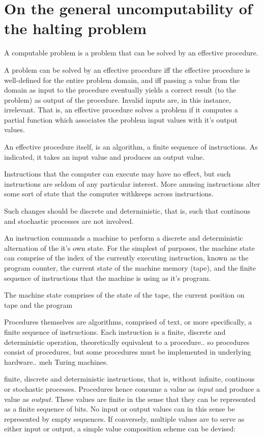 \chapter{On the general uncomputability of the halting problem}

A computable problem is a problem that can be solved by an effective procedure.

A problem can be solved by an effective procedure iff the effective procedure
is well-defined for the entire problem domain, and iff passing a value from the
domain as input to the procedure eventually yields a correct result (to the
problem) as output of the procedure. Invalid inputs are, in this instance,
irrelevant. That is, an effective procedure solves a problem if it computes a
partial function which associates the problem input values with it's output
values.

An effective procedure itself, is an algorithm, a finite sequence of
instructions. As indicated, it takes an input value and produces an output
value.





Instructions that the computer can execute may have no effect, but such
instructions are seldom of any particular interest. More amusing instructions
alter some sort of state that the computer withkeeps across instructions.

Such changes should be discrete and deterministic, that is, such that continous
and stochastic processes are not involved.

An instruction
commands a machine to perform a discrete and deterministic alternation of the
it's own state. For the simplest of purposes, the machine state can comprise of
the index of the currently executing instruction, known as the program counter,
the current state of the machine memory (tape), and the finite sequence of
instructions that the machine is using as it's program.

The machine state comprises of the state of the tape, the current position on
tape and the program



Procedures themselves are algorithms, comprised of text, or more specifically,
a finite sequence of instructions. Each instruction is a finite, discrete and
deterministic operation, theoretically equivalent to a procedure.. so
procedures consist of procedures, but some procedures must be implemented in
underlying hardware.. meh Turing machines.

finite, discrete and deterministic instructions, that is,
without infinite, continous or stochastic processes. Procedures hence consume a
value as \emph{input} and produce a value as \emph{output}. These values are
finite in the sense that they can be represented as a finite sequence of bits.
No input or output values can in this sense be represented by empty sequences.
If conversely, multiple values are to serve as either input or output, a simple
value composition scheme can be devised:

